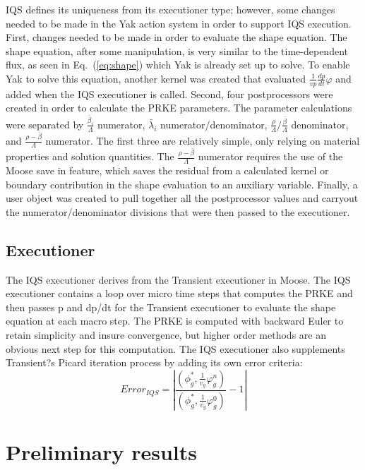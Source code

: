 \documentclass[12pt]{article}
\newcommand{\eqt}[1]{Eq.~(\ref{#1})}                     %
\newcommand{\be}{\begin{equation}}
\newcommand{\ee}{\end{equation}}
\begin{document}
IQS defines its uniqueness from its executioner type; however, some changes needed to be made in the Yak action system in order to support IQS execution.   First, changes needed to be made in order to evaluate the shape equation.  The shape equation, after some manipulation, is very similar to the time-dependent flux, as seen in \eqt{eq:shape} which Yak is already set up to solve.  To enable Yak to solve this equation, another kernel was created that evaluated $\frac{1}{vp}\frac{dp}{dt}\varphi$ and added when the IQS executioner is called.  Second, four postprocessors were created in order to calculate the PRKE parameters.  The parameter calculations were separated by $\frac{\bar{\beta}_i}{\Lambda}$ numerator, $\bar{\lambda}_i$ numerator/denominator, $\frac{\rho}{\Lambda}/\frac{\bar{\beta}}{\Lambda}$ denominator, and $\frac{\rho-\bar{\beta}}{\Lambda}$ numerator.  The first three are relatively simple, only relying on material properties and solution quantities.  The $\frac{\rho-\bar{\beta}}{\Lambda}$ numerator requires the use of the Moose save in feature, which saves the residual from a calculated kernel or boundary contribution in the shape evaluation to an auxiliary variable.  Finally, a user object was created to pull together all the postprocessor values and carryout the numerator/denominator divisions that were then passed to the executioner.

\subsection{Executioner}

The IQS executioner derives from the Transient executioner in Moose.  The IQS executioner contains a loop over micro time steps that computes the PRKE and then passes p and dp/dt for the Transient executioner to evaluate the shape equation at each macro step.  The PRKE is computed with backward Euler to retain simplicity and insure convergence, but higher order methods are an obvious next step for this computation.   The IQS executioner also supplements Transient?s Picard iteration process by adding its own error criteria: 
\be
Error_{IQS}=\left|\frac{\left(\phi^*_g,\frac{1}{v_g}\varphi_g^n\right)}{\left(\phi_g^*,\frac{1}{v_g}\varphi_g^0\right)}-1\right|
\ee

%
\section{Preliminary results} 
\label{sect::results}
\end{document}
